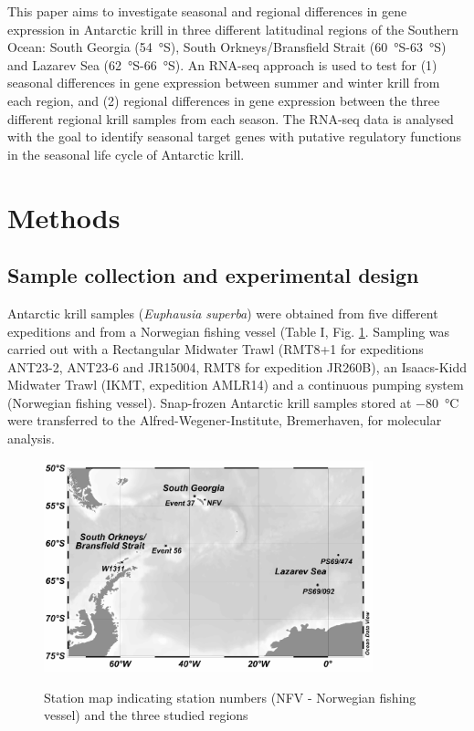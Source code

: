 This paper aims to investigate seasonal and regional differences in gene
expression in Antarctic krill in three different latitudinal regions of the
Southern Ocean: South Georgia (\SI{54}{\degree}S), South Orkneys/Bransfield
Strait (\SI{60}{\degree}S-\SI{63}{\degree}S) and Lazarev Sea
(\SI{62}{\degree}S-\SI{66}{\degree}S). An RNA-seq approach is used to test for
(1) seasonal differences in gene expression between summer and winter krill
from each region, and (2) regional differences in gene expression between the
three different regional krill samples from each season. The RNA-seq data is
analysed with the goal to identify seasonal target genes with putative
regulatory functions in the seasonal life cycle of Antarctic krill.

\section{Methods}

\subsection*{Sample collection and experimental design}

Antarctic krill samples (\textit{Euphausia superba}) were obtained from five
different expeditions and from a Norwegian fishing vessel (Table I, Fig. \ref{Pub1_1}.
Sampling was carried out with a Rectangular Midwater Trawl (RMT8+1 for
expeditions ANT23-2, ANT23-6 and JR15004, RMT8 for expedition JR260B), an
Isaacs-Kidd Midwater Trawl (IKMT, expedition AMLR14) and a continuous pumping
system (Norwegian fishing vessel). Snap-frozen Antarctic krill samples stored
at \SI{-80}{\celsius} were transferred to the Alfred-Wegener-Institute, Bremerhaven,
for molecular analysis.

\begin{figure}
        \caption{Station map indicating station numbers (NFV - Norwegian
        fishing vessel) and the three studied regions}
        \centering
        \includegraphics[width=0.85\textwidth]{../Figures/Pub1_1.pdf}
        \label{Pub1_1}
\end{figure}

